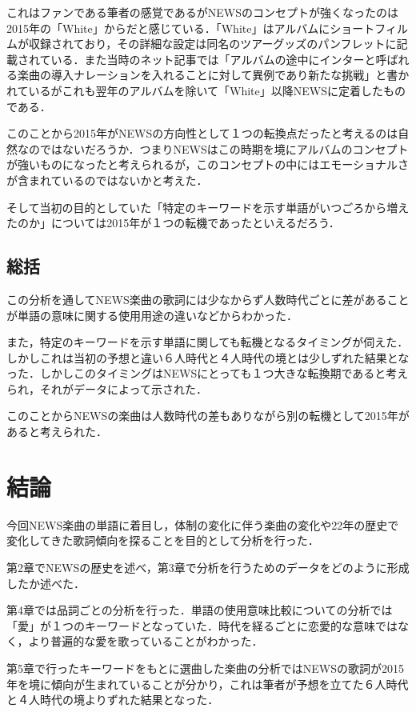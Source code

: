 これはファンである筆者の感覚であるがNEWSのコンセプトが強くなったのは2015年の「White」からだと感じている．「White」はアルバムにショートフィルムが収録されており，その詳細な設定は同名のツアーグッズのパンフレットに記載されている．また当時のネット記事\cite{White}では「アルバムの途中にインターと呼ばれる楽曲の導入ナレーションを入れることに対して異例であり新たな挑戦」と書かれているがこれも翌年のアルバムを除いて「White」以降NEWSに定着したものである．

このことから2015年がNEWSの方向性として１つの転換点だったと考えるのは自然なのではないだろうか．つまりNEWSはこの時期を境にアルバムのコンセプトが強いものになったと考えられるが，このコンセプトの中にはエモーショナルさが含まれているのではないかと考えた．

そして当初の目的としていた「特定のキーワードを示す単語がいつごろから増えたのか」については2015年が１つの転機であったといえるだろう．


\subsection{総括}
この分析を通してNEWS楽曲の歌詞には少なからず人数時代ごとに差があることが単語の意味に関する使用用途の違いなどからわかった．

また，特定のキーワードを示す単語に関しても転機となるタイミングが伺えた．しかしこれは当初の予想と違い６人時代と４人時代の境とは少しずれた結果となった．しかしこのタイミングはNEWSにとっても１つ大きな転換期であると考えられ，それがデータによって示された．

このことからNEWSの楽曲は人数時代の差もありながら別の転機として2015年があると考えられた．


\section{結論}
今回NEWS楽曲の単語に着目し，体制の変化に伴う楽曲の変化や22年の歴史で変化してきた歌詞傾向を探ることを目的として分析を行った．

第2章でNEWSの歴史を述べ，第3章で分析を行うためのデータをどのように形成したか述べた．

第4章では品詞ごとの分析を行った．単語の使用意味比較についての分析では「愛」が１つのキーワードとなっていた．時代を経るごとに恋愛的な意味ではなく，より普遍的な愛を歌っていることがわかった．

第5章で行ったキーワードをもとに選曲した楽曲の分析ではNEWSの歌詞が2015年を境に傾向が生まれていることが分かり，これは筆者が予想を立てた６人時代と４人時代の境よりずれた結果となった．


